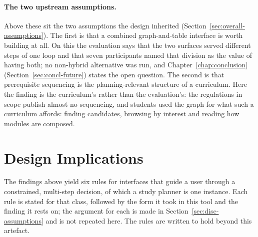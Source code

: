\paragraph{The two upstream assumptions.}
Above these sit the two assumptions the design inherited (Section~\ref{sec:overall-assumptions}). The first is that a combined graph-and-table interface is worth building at all. On this the evaluation says that the two surfaces served different steps of one loop and that seven participants named that division as the value of having both; no non-hybrid alternative was run, and Chapter~\ref{chap:conclusion} (Section~\ref{sec:concl-future}) states the open question. The second is that prerequisite sequencing is the planning-relevant structure of a curriculum. Here the finding is the curriculum's rather than the evaluation's: the regulations in scope publish almost no sequencing, and students used the graph for what such a curriculum affords: finding candidates, browsing by interest and reading how modules are composed.


\section{Design Implications}
\label{sec:disc-implications}
The findings above yield six rules for interfaces that guide a user through a constrained, multi-step decision, of which a study planner is one instance. Each rule is stated for that class, followed by the form it took in this tool and the finding it rests on; the argument for each is made in Section~\ref{sec:disc-assumptions} and is not repeated here. The rules are written to hold beyond this artefact.

